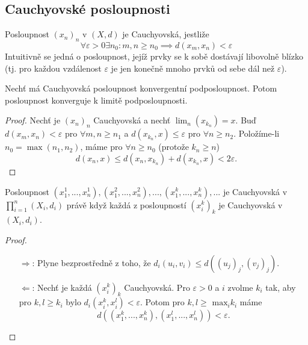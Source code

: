 \documentclass[../main.tex]{subfiles}
\begin{document}
\subsection{Cauchyovské posloupnosti}

\begin{definition}
	Posloupnost $(x_n)_n$ v $(X,d)$ je Cauchyovská, jestliže
	\[ \forall \varepsilon > 0 \exists n_0: m,n \geq n_0 \implies d(x_m, x_n) < \varepsilon \]
	Intuitivně se jedná o posloupnost, jejíž prvky se k sobě dostávají libovolně blízko (tj. pro každou vzdálenost $\varepsilon$ je jen konečně mnoho prvků od sebe dál než $\varepsilon$).
\end{definition}

\begin{lemma}
	Nechť má Cauchyovská posloupnost konvergentní podposloupnost. Potom posloupnost konverguje k limitě
	podposloupnosti.
\end{lemma}

\begin{proof}
	Nechť je $(x_n)_n$ Cauchyovská a nechť $\lim_{n}(x_{k_n}) = x.$ Buď $d(x_m,x_n) < \varepsilon$ pro $ \forall m,n \geq n_1$ 
	a $d(x_{k_n},x) \leq \varepsilon$ pro $\forall n \geq n_2$. Položíme-li $n_0 = \max(n_1,n_2)$, máme pro $\forall n \geq n_0$ (protože $k_n \geq n$)
	\[d(x_n,x) \leq d(x_n,x_{k_n}) + d(x_{k_n},x) < 2\varepsilon.\]
\end{proof}

\begin{lemma}
	Posloupnost $(x_{1}^{1}, ... , x_{n}^{1}), (x_{1}^{2},...,x_{n}^{2}), ...,(x_{1}^{k},...,x_{n}^{k}),...$
	je Cauchyovská v $\prod_{i=1}^{n}(X_i, d_i)$ právě když každá z posloupností $(x_{i}^{k})_k$ je
	Cauchyovská v $(X_i, d_i)$.
\end{lemma}

\begin{proof}
	\begin{itemize}
	    \item[ $\Rightarrow$:] Plyne bezprostředně z toho, že $d_i(u_i,v_i) \leq d((u_j)_j,(v_j)_j).$
	    \item[ $\Leftarrow$:] Nechť je každá $(x_i^k)_k$ Cauchyovská. Pro $\varepsilon > 0$ a $i$ zvolme $k_i$ tak,
	    aby pro $k,l \geq k_i$ bylo $d_i(x_i^k, x_i^l) < \varepsilon.$ Potom pro $k,l \geq$ $\text{max}_i k_i$ máme 
	    \[d((x_1^k,...,x_n^k),(x_1^l,...,x_n^l)) < \varepsilon.\]
	\end{itemize}
\end{proof}
\end{document}
